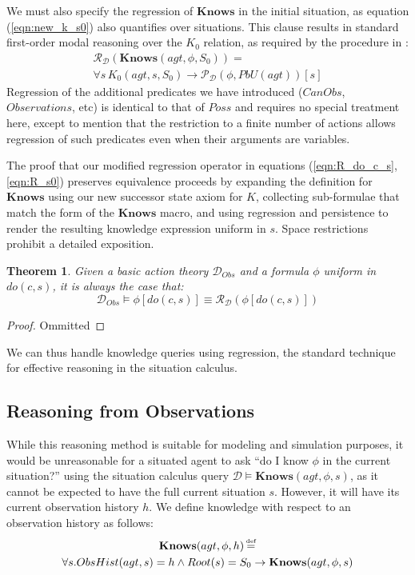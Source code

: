 \documentclass{ifaamas-submission}
\newcommand{\isdef}{\hbox{$\stackrel{\mbox{\tiny def}}{=}$}}
\newtheorem{theorem}{Theorem}
\begin{document}
We must also specify the regression of $\mathbf{Knows}$ in the initial
situation, as equation (\ref{eqn:new_k_s0}) also quantifies over
situations. This clause results in standard first-order modal reasoning
over the $K_{0}$ relation, as required by the procedure in \cite{scherl03sc_knowledge}:\begin{multline}
\mathcal{R}_{\mathcal{D}}(\mathbf{Knows}(agt,\phi,S_{0}))=\\
\forall s\, K_{0}(agt,s,S_{0})\rightarrow\mathcal{P}_{\mathcal{D}}(\phi,PbU(agt))[s]\label{eqn:R_s0}\end{multline}
 Regression of the additional predicates we have introduced ($CanObs$,
$Observations$, etc) is identical to that of $Poss$ and requires
no special treatment here, except to mention that the restriction
to a finite number of actions allows regression of such predicates
even when their arguments are variables.

The proof that our modified regression
operator in equations (\ref{eqn:R_do_c_s},\ref{eqn:R_s0}) preserves
equivalence proceeds by expanding the definition for $\mathbf{Knows}$
using our new successor state axiom for $K$, collecting sub-formulae
that match the form of the $\mathbf{Knows}$ macro, and using regression
and persistence to render the resulting knowledge expression uniform
in $s$.  Space restrictions prohibit a detailed exposition.

\begin{theorem}%
Given a basic action theory $\mathcal{D}_{Obs}$ and a formula $\phi$
uniform in $do(c,s)$, it is always the case that:\[
\mathcal{D}_{Obs}\models\phi[do(c,s)]\equiv\mathcal{R}_{\mathcal{D}}(\phi[do(c,s)])\]
 
\end{theorem}%
\begin{proof}%
Ommitted
\end{proof}%
We can thus handle knowledge queries using regression, the standard
technique for effective reasoning in the situation calculus.


\subsection{Reasoning from Observations}

While this reasoning method is suitable for modeling and simulation
purposes, it would be unreasonable for a situated agent to ask {}``do
I know $\phi$ in the current situation?'' using the situation calculus
query $\mathcal{D}\models\mathbf{Knows}(agt,\phi,s)$, as it cannot
be expected to have the full current situation $s$. However, it will
have its current observation history $h$. We define knowledge with
respect to an observation history as follows:\begin{multline*}
\mathbf{Knows}(agt,\phi,h)\,\isdef\\
\forall s.ObsHist(agt,s)=h\wedge Root(s)=S_{0}\rightarrow\mathbf{Knows}(agt,\phi,s)\end{multline*}
\end{document}
